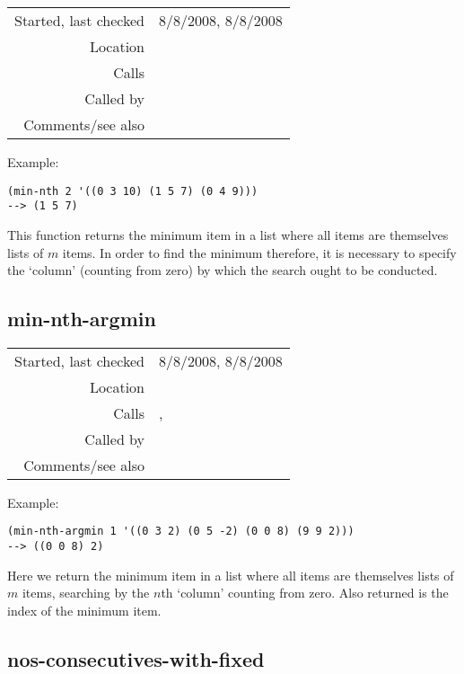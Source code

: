 \vspace{0.3cm}
\begin{tabular}{r|p{8cm}}
Started, last checked & 8/8/2008, 8/8/2008 \\
Location & \nameref{sec:sort-by} \\
Calls & \\
Called by & \nameref{fun:min-nth-argmin} \\
Comments/see also & \nameref{fun:max-nth}
\end{tabular}

\vspace{0.5cm}
\noindent Example:
\begin{verbatim}
(min-nth 2 '((0 3 10) (1 5 7) (0 4 9)))
--> (1 5 7)
\end{verbatim}

\noindent This function returns the minimum item in a
list where all items are themselves lists of $m$
items. In order to find the minimum therefore, it is
necessary to specify the `column' (counting from zero)
by which the search ought to be conducted.


\subsection*{min-nth-argmin}\label{fun:min-nth-argmin}

\vspace{0.3cm}
\begin{tabular}{r|p{8cm}}
Started, last checked & 8/8/2008, 8/8/2008 \\
Location & \nameref{sec:sort-by} \\
Calls & \nameref{fun:index-item-1st-occurs}, \nameref{fun:min-nth} \\
Called by & \\
Comments/see also & \nameref{fun:max-nth-argmax}
\end{tabular}

\vspace{0.5cm}
\noindent Example:
\begin{verbatim}
(min-nth-argmin 1 '((0 3 2) (0 5 -2) (0 0 8) (9 9 2)))
--> ((0 0 8) 2)
\end{verbatim}

\noindent Here we return the minimum item in a list
where all items are themselves lists of $m$ items,
searching by the $n$th `column' counting from zero.
Also returned is the index of the minimum item.


\subsection*{nos-consecutives-with-fixed}\label{fun:nos-consecutives-with-fixed}

